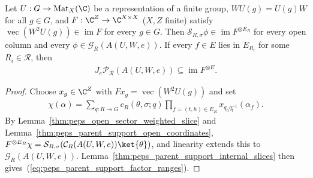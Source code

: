 \begin{lemma}%
    \label{thm:peps_parent_support_factor_ranges}
    \leanok
    Let $U:G\to\operatorname{Mat}_X(\C)$ be a representation of a
    finite group, $WU(g)=U(g)W$ for all $g\in G$, and
    $F:\C^Z\to\C^{X\times X}$ ($X,Z$ finite) satisfy
    $\operatorname{vec}(W^2U(g))\in\operatorname{im}F$ for every $g\in G$.
    Then $\mathcal S_{R,\sigma}\phi\in\operatorname{im}F^{\otimes E_R}$ for
    every open column and every $\phi\in\mathcal G_R(A(U,W,e))$.
    If every $f\in E$ lies in $E_{R_i}$ for some $R_i\in\mathcal R$, then
    \begin{align}
        J_e\mathcal P_{\mathcal R}(A(U,W,e))
        \subseteq\operatorname{im}F^{\otimes E}.
        \label{eq:peps_parent_support_factor_ranges}
    \end{align}
\end{lemma}
\begin{proof}\leanok
    Choose $x_g\in\C^Z$ with $Fx_g=\operatorname{vec}(W^2U(g))$ and set
    \begin{align}
        \chi(\alpha)=\sum_{q:R\to G}c_R(\theta,\sigma;q)
        \prod_{f=(t,h)\in E_R}x_{q_hq_t^{-1}}(\alpha_f).
    \end{align}
    By Lemma~\ref{thm:peps_open_sector_weighted_slice} and
    Lemma~\ref{thm:peps_parent_support_open_coordinates},
    $F^{\otimes E_R}\chi=\mathcal S_{R,\sigma}(\mathcal C_R(A(U,W,e))\ket{\theta})$,
    and linearity extends this to $\mathcal G_R(A(U,W,e))$.
    Lemma~\ref{thm:peps_parent_support_internal_slices} then gives~(\ref{eq:peps_parent_support_factor_ranges}).
\end{proof}

